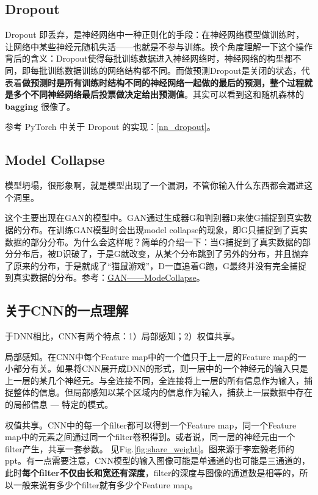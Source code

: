 \subsection{Dropout}
Dropout 即丢弃，是神经网络中一种正则化的手段：在神经网络模型做训练时，让网络中某些神经元随机失活——也就是不参与训练。换个角度理解一下这个操作背后的含义：Dropout使得每批训练数据进入神经网络时，神经网络的构型都不同，即每批训练数据训练的网络结构都不同。而做预测Dropout是关闭的状态，代表着\textbf{做预测时是所有训练时结构不同的神经网络一起做的最后的预测，整个过程就是多个不同神经网络最后投票做决定给出预测值}。其实可以看到这和随机森林的 \textbf{bagging} 很像了。

参考 PyTorch 中关于 Dropout 的实现：\ref{nn_dropout}。

\subsection{Model Collapse}
模型坍塌，很形象啊，就是模型出现了一个漏洞，不管你输入什么东西都会漏进这个洞里。

这个主要出现在GAN的模型中。GAN通过生成器G和判别器D来使G捕捉到真实数据的分布。在训练GAN模型时会出现model collapse的现象，即G只捕捉到了真实数据的部分分布。为什么会这样呢？简单的介绍一下：当G捕捉到了真实数据的部分分布后，被D识破了，于是G就改变，从某个分布跳到了另外的分布，并且抛弃了原来的分布，于是就成了“猫鼠游戏”，D一直追着G跑，G最终并没有完全捕捉到真实数据的分布。参考：\href{https://blog.csdn.net/SPARKKKK/article/details/72598041}{GAN——ModeCollapse}。


\subsection{关于CNN的一点理解}
于DNN相比，CNN有两个特点：1）局部感知；2）权值共享。

局部感知。在CNN中每个Feature map中的一个值只于上一层的Feature map的一小部分有关。如果将CNN展开成DNN的形式，则一层中的一个神经元的输入只是上一层的某几个神经元。与全连接不同，全连接将上一层的所有信息作为输入，捕捉整体的信息。但局部感知以某个区域内的信息作为输入，捕获上一层数据中存在的局部信息 --- 特定的模式。

权值共享。CNN中的每一个filter都可以得到一个Feature map，同一个Feature map中的元素之间通过同一个filter卷积得到。或者说，同一层的神经元由一个filter产生，共享一套参数。
见Fig.\ref{fig:share_weight}。图来源于李宏毅老师的ppt。有一点需要注意，CNN模型的输入图像可能是单通道的也可能是三通道的，此时\textbf{每个filter不仅由长和宽还有深度}，filter的深度与图像的通道数是相等的，所以一般来说有多少个filter就有多少个Feature map。


